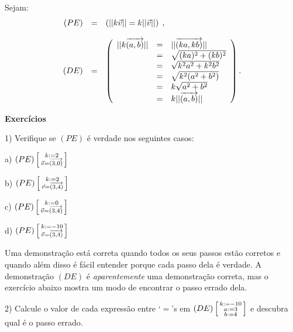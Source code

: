 \documentclass[oneside]{book}
\begin{document}

Sejam:
%
$$\begin{array}{rcl}
  (PE) &=& \left( ||k{\vec v}|| = k||{\vec v}|| \right) \; , \\
  \\
  (DE) &=& \left(
           \begin{array}{rcl}
           ||k{\overrightarrow{(a,b)}}|| &=& ||{\overrightarrow{(ka,kb)}}|| \\
                          &=& \sqrt{(ka)^2+(kb)^2} \\
                          &=& \sqrt{k^2a^2+k^2b^2} \\
                          &=& \sqrt{k^2(a^2+b^2)} \\
                          &=& k\sqrt{a^2+b^2} \\
                          &=& k||{\overrightarrow{(a,b)}}|| \\
           \end{array}
           \right) .\\
  \end{array}
$$

{\bf Exercícios}

1) Verifique se $(PE)$ é verdade nos seguintes casos:

a) $(PE) \left[\begin {smallmatrix}k:=2 \\ {\vec v}={\overrightarrow{(3,0)}}\end{smallmatrix}\right]$

b) $(PE) \left[\begin {smallmatrix}k:=2 \\ {\vec v}={\overrightarrow{(3,4)}}\end{smallmatrix}\right]$

c) $(PE) \left[\begin {smallmatrix}k:=0 \\ {\vec v}={\overrightarrow{(3,4)}}\end{smallmatrix}\right]$

d) $(PE) \left[\begin {smallmatrix}k:=-10 \\ {\vec v}={\overrightarrow{(3,4)}}\end{smallmatrix}\right]$

\msk

Uma demonstração está correta quando todos os seus passos estão
corretos e quando além disso é fácil entender porque cada passo dela é
verdade. A demonstração $(DE)$ é {\sl aparentemente} uma demonstração
correta, mas o exercício abaixo mostra um modo de encontrar o passo
errado dela.

\msk

2) Calcule o valor de cada expressão entre `$=$'s em $(DE)
\left[\begin {smallmatrix}k:=-10 \\ a:=3 \\ b:=4\\\end{smallmatrix}\right]$ e descubra qual é o passo errado.

\msk
\end{document}

